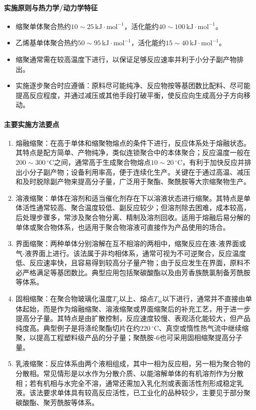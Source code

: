 ﻿\documentclass[12pt,a4paper]{article}
\begin{document}
\paragraph{实施原则与热力学/动力学特征}
\begin{itemize}
  \item 缩聚单体聚合热约$10\sim 25\,\mathrm{kJ\cdot mol^{-1}}$，活化能约$40\sim 100\,\mathrm{kJ\cdot mol^{-1}}$。
  \item 乙烯基单体聚合热约$50\sim 95\,\mathrm{kJ\cdot mol^{-1}}$，活化能约$15\sim 40\,\mathrm{kJ\cdot mol^{-1}}$。
  \item 缩聚通常需在较高温度下进行，以保证足够反应速率并利于小分子副产物排出。
  \item 实施逐步聚合时应遵循：原料尽可能纯净、反应物按等基团数比配料、尽可能提高反应程度，并通过减压或其他手段打破平衡，使反应向生成高分子方向移动。
\end{itemize}

\paragraph{主要实施方法要点}
\begin{enumerate}[1)]
  \item 熔融缩聚：在高于单体和缩聚物熔点的条件下进行，反应体系处于熔融状态。其特点是配方简单、产物纯净，类似连锁聚合中的本体聚合；反应温度一般在$200\sim 300\,^{\circ}\mathrm{C}$之间，通常高于生成聚合物熔点$10\sim 20\,^{\circ}\mathrm{C}$，有利于加快反应并排出小分子副产物；设备利用率高，便于连续化生产。关键在于通过高温、减压和及时脱除副产物来提高分子量，广泛用于聚酯、聚酰胺等大宗缩聚物生产。
  \item 溶液缩聚：单体在溶剂和适当催化剂存在下以溶液状态进行缩聚。其特点是单体活性通常较高、聚合温度较低、副反应较少；但溶剂除去困难，成本较高，后处理步骤多，常涉及聚合物分离、精制及溶剂回收。适用于熔融后易分解的单体或聚合物体系，也适用于聚合物溶液可直接作为产品使用的场合。
  \item 界面缩聚：两种单体分别溶解在互不相溶的两相中，缩聚反应在液-液界面或气-液界面上进行。该法属于非均相体系，通常可视为不可逆聚合，反应温度低、反应速率快，且容易得到较高分子量产物；由于反应发生在界面，原料不必严格满足等基团数比。典型应用包括聚碳酸酯以及由芳香族酰氯制备芳酰胺等体系。
  \item 固相缩聚：在聚合物玻璃化温度$T_g$以上、熔点$T_m$以下进行，通常并不直接由单体起始，而是作为熔融缩聚、溶液缩聚或界面缩聚后的补充工艺，用于进一步提高分子量。其特点是由扩散控制，反应速度较慢、表观活化能较大，但产品纯度高。典型例子是将涤纶聚酯切片在约$220\,^{\circ}\mathrm{C}$、真空或惰性热气流中继续缩聚，以提高工程塑料级产品的分子量；聚酰胺-6也可采用固相缩聚提高分子量。
  \item 乳液缩聚：反应体系由两个液相组成，其中一相为反应相，另一相为聚合物的分散相。常见情形是以水作为分散介质、以能溶解单体的有机溶剂作为分散相；若有机相与水完全不溶，通常还需加入乳化剂或表面活性剂形成稳定乳液。该法要求单体具有较高反应活性，已工业化的品种较少，主要见于部分聚碳酸酯、聚芳酰胺等体系。
\end{enumerate}
\end{document}
